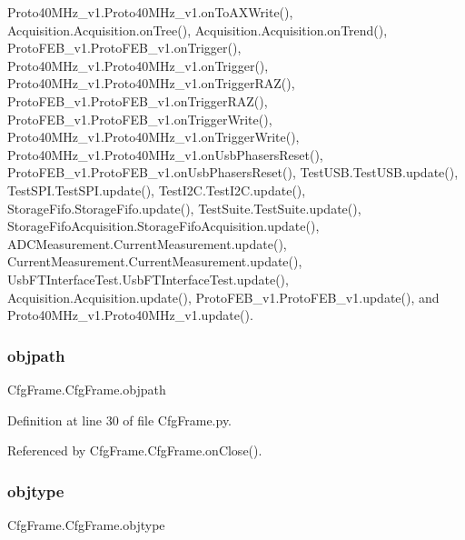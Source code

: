 Proto40\+M\+Hz\+\_\+v1.\+Proto40\+M\+Hz\+\_\+v1.\+on\+To\+A\+X\+Write(), Acquisition.\+Acquisition.\+on\+Tree(), Acquisition.\+Acquisition.\+on\+Trend(), Proto\+F\+E\+B\+\_\+v1.\+Proto\+F\+E\+B\+\_\+v1.\+on\+Trigger(), Proto40\+M\+Hz\+\_\+v1.\+Proto40\+M\+Hz\+\_\+v1.\+on\+Trigger(), Proto40\+M\+Hz\+\_\+v1.\+Proto40\+M\+Hz\+\_\+v1.\+on\+Trigger\+R\+A\+Z(), Proto\+F\+E\+B\+\_\+v1.\+Proto\+F\+E\+B\+\_\+v1.\+on\+Trigger\+R\+A\+Z(), Proto\+F\+E\+B\+\_\+v1.\+Proto\+F\+E\+B\+\_\+v1.\+on\+Trigger\+Write(), Proto40\+M\+Hz\+\_\+v1.\+Proto40\+M\+Hz\+\_\+v1.\+on\+Trigger\+Write(), Proto40\+M\+Hz\+\_\+v1.\+Proto40\+M\+Hz\+\_\+v1.\+on\+Usb\+Phasers\+Reset(), Proto\+F\+E\+B\+\_\+v1.\+Proto\+F\+E\+B\+\_\+v1.\+on\+Usb\+Phasers\+Reset(), Test\+U\+S\+B.\+Test\+U\+S\+B.\+update(), Test\+S\+P\+I.\+Test\+S\+P\+I.\+update(), Test\+I2\+C.\+Test\+I2\+C.\+update(), Storage\+Fifo.\+Storage\+Fifo.\+update(), Test\+Suite.\+Test\+Suite.\+update(), Storage\+Fifo\+Acquisition.\+Storage\+Fifo\+Acquisition.\+update(), A\+D\+C\+Measurement.\+Current\+Measurement.\+update(), Current\+Measurement.\+Current\+Measurement.\+update(), Usb\+F\+T\+Interface\+Test.\+Usb\+F\+T\+Interface\+Test.\+update(), Acquisition.\+Acquisition.\+update(), Proto\+F\+E\+B\+\_\+v1.\+Proto\+F\+E\+B\+\_\+v1.\+update(), and Proto40\+M\+Hz\+\_\+v1.\+Proto40\+M\+Hz\+\_\+v1.\+update().

\mbox{\label{classCfgFrame_1_1CfgFrame_a0a33bcbfbac5e80e5c4d0069ed9d6c91}} 
\subsubsection{\texorpdfstring{objpath}{objpath}}
{\footnotesize\ttfamily Cfg\+Frame.\+Cfg\+Frame.\+objpath}



Definition at line 30 of file Cfg\+Frame.\+py.



Referenced by Cfg\+Frame.\+Cfg\+Frame.\+on\+Close().

\mbox{\label{classCfgFrame_1_1CfgFrame_a224427c3ba9e154dbdf952a8150cd254}} 
\subsubsection{\texorpdfstring{objtype}{objtype}}
{\footnotesize\ttfamily Cfg\+Frame.\+Cfg\+Frame.\+objtype}



